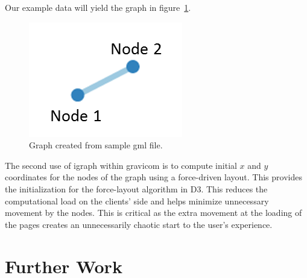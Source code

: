 \documentclass{article}\usepackage[]{graphicx}\usepackage[]{color}
\begin{document}
Our example data will yield the graph in figure~\ref{fig:samplegraph}.

\begin{figure}[H]
\centering
\includegraphics{images/samplegraph.png}
\caption{\label{fig:samplegraph} Graph created from sample gml file.}
\end{figure}
The second use of igraph within gravicom is to compute initial $x$ and $y$ coordinates for the nodes of the graph using a force-driven layout. This provides the initialization for the force-layout algorithm in D3. This reduces the computational load on the clients' side and helps minimize unnecessary movement by the nodes. This is critical as the extra movement at the loading of the pages creates an unnecessarily chaotic start to the user's experience. 




\section{Further Work}

\printbibliography
\end{document}
